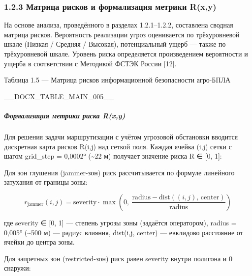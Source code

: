 \documentclass[14pt,a4paper]{extarticle}
\begin{document}
\hypertarget{ux43cux430ux442ux440ux438ux446ux430-ux440ux438ux441ux43aux43eux432-ux438-ux444ux43eux440ux43cux430ux43bux438ux437ux430ux446ux438ux44f-ux43cux435ux442ux440ux438ux43aux438-rxy}{%
\subsubsection{1.2.3 Матрица рисков и формализация метрики R(x,y)}\label{ux43cux430ux442ux440ux438ux446ux430-ux440ux438ux441ux43aux43eux432-ux438-ux444ux43eux440ux43cux430ux43bux438ux437ux430ux446ux438ux44f-ux43cux435ux442ux440ux438ux43aux438-rxy}}

На основе анализа, проведённого в разделах 1.2.1--1.2.2, составлена сводная матрица рисков. Вероятность реализации угроз оценивается по трёхуровневой шкале (Низкая / Средняя / Высокая), потенциальный ущерб --- также по трёхуровневой шкале. Уровень риска определяется произведением вероятности и ущерба в соответствии с Методикой ФСТЭК России {[}12{]}.

Таблица 1.5 --- Матрица рисков информационной безопасности агро-БПЛА



__DOCX_TABLE_MAIN_005__



\hypertarget{ux444ux43eux440ux43cux430ux43bux438ux437ux430ux446ux438ux44f-ux43cux435ux442ux440ux438ux43aux438-ux440ux438ux441ux43aux430-rxy}{%
\subparagraph{Формализация метрики риска R(x,y)}\label{ux444ux43eux440ux43cux430ux43bux438ux437ux430ux446ux438ux44f-ux43cux435ux442ux440ux438ux43aux438-ux440ux438ux441ux43aux430-rxy}}

Для решения задачи маршрутизации с учётом угрозовой обстановки вводится дискретная карта рисков R(i,j) над сеткой поля. Каждая ячейка (i,j) сетки с шагом grid\_step = 0,0002° (\textasciitilde22 м) получает значение риска R ∈ {[}0, 1{]}:

Для зон глушения (jammer-зон) риск рассчитывается по формуле линейного затухания от границы зоны:

\[r_{\mathrm{jammer}}(i,j) = \mathrm{severity} \cdot \max\!\left(0,\ \frac{\mathrm{radius} - \mathrm{dist}((i,j),\, \mathrm{center})}{\mathrm{radius}}\right)\]

где severity ∈ {[}0, 1{]} --- степень угрозы зоны (задаётся оператором), radius = 0,005° (\textasciitilde500 м) --- радиус влияния, dist(i,j, center) --- евклидово расстояние от ячейки до центра зоны.

Для запретных зон (restricted-зон) риск равен severity внутри полигона и 0 снаружи:
\end{document}
